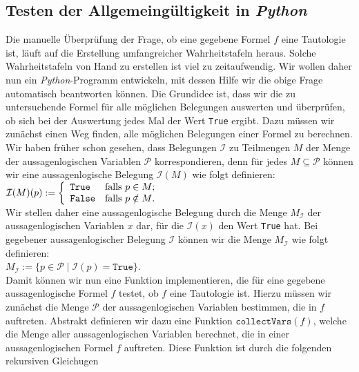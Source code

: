 \subsection{Testen der Allgemeingültigkeit in \textsl{Python}}
\noindent
 Die manuelle Überprüfung der Frage, ob eine gegebene Formel $f$ eine Tautologie ist, 
läuft auf die Erstellung umfangreicher Wahrheitstafeln heraus.   Solche Wahrheitstafeln
von Hand zu erstellen ist viel zu zeitaufwendig. 
Wir wollen daher nun ein \textsl{Python}-Programm entwickeln, mit dessen Hilfe wir die
obige Frage automatisch beantworten können.   Die Grundidee ist, dass wir die zu untersuchende
Formel für alle möglichen Belegungen auswerten und überprüfen, ob sich bei der Auswertung
jedes Mal der Wert \texttt{True} ergibt.  Dazu müssen wir zunächst einen Weg finden, alle
möglichen Belegungen einer Formel zu berechnen.  Wir haben früher schon gesehen, dass
Belegungen $\mathcal{I}$ zu Teilmengen $M$ der Menge der aussagenlogischen Variablen
$\mathcal{P}$ korrespondieren, denn für jedes $M \subseteq \mathcal{P}$ können wir eine
aussagenlogische Belegung $\mathcal{I}(M)$ wie folgt definieren:
\\[0.2cm]
\hspace*{1.3cm}
$\mathcal{I}(M)(p) := \left\{
\begin{array}[c]{ll}
  \texttt{True}  & \mbox{falls $p \in M$;} \\
  \texttt{False} & \mbox{falls $p \notin M$.}
\end{array}
\right.
$
\\[0.2cm]
Wir stellen daher eine aussagenlogische Belegung durch die Menge $M_\mathcal{I}$ der aussagenlogischen Variablen
$x$ dar, für die $\mathcal{I}(x)$ den Wert \texttt{True} hat.  Bei gegebener aussagenlogischer Belegung
$\mathcal{I}$ können wir die Menge $M_\mathcal{I}$ wie folgt definieren:
\\[0.2cm]
\hspace*{1.3cm}
$M_\mathcal{I} := \bigl\{ p \in \mathcal{P} \mid \mathcal{I}(p) = \texttt{True} \bigr\}$.
\\[0.2cm]
Damit können wir nun eine Funktion implementieren, die für eine gegebene aussagenlogische Formel $f$
testet, ob $f$ eine Tautologie ist.  Hierzu müssen wir zunächst die Menge 
$\mathcal{P}$ der
aussagenlogischen Variablen bestimmen, die in $f$ auftreten.  Abstrakt definieren wir dazu eine Funktion 
$\mathtt{collectVars}(f)$, welche die Menge aller aussagenlogischen Variablen berechnet, die in einer
aussagenlogischen Formel $f$ auftreten.  Diese Funktion ist durch die folgenden rekursiven Gleichugen 
